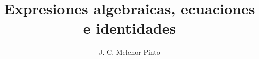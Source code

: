 \documentclass[12pt]{guia}
\title{Expresiones algebraicas, ecuaciones e identidades}
\author{J. C. Melchor Pinto}
\begin{document}
\pagestyle{headandfoot}
\addpoints
\INFO
\vspace{-1cm}
\begin{multicols}{2}
    
    \columnbreak
    
    
    
\end{multicols}

\begin{questions}
    \questionboxed[10] 
    \questionboxed[10] 
    \questionboxed[10] 
    \questionboxed[10] 
    \questionboxed[10] 
    \questionboxed[10] 
    \questionboxed[10] 
    \questionboxed[10] 
    \questionboxed[10] 
    \questionboxed[10] 
\end{questions}
\end{document}
